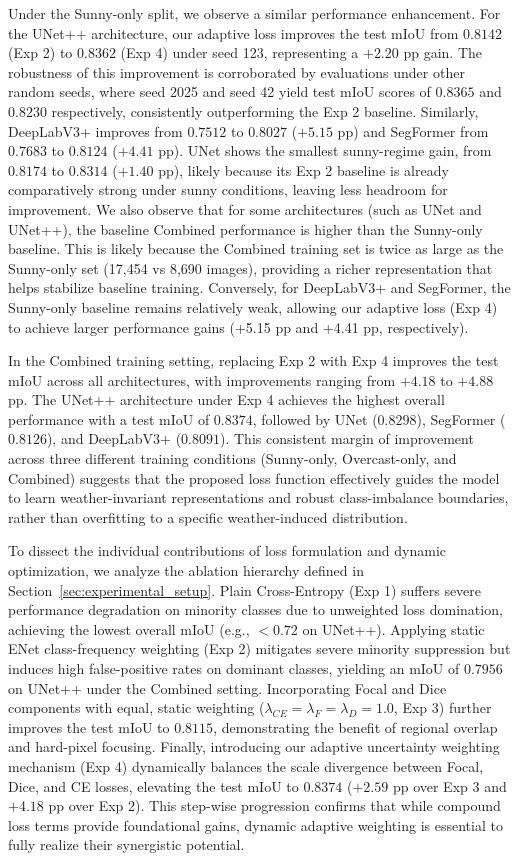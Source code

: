 \documentclass[journal,compsoc]{IEEEtran}
\begin{document}
Under the Sunny-only split, we observe a similar performance enhancement. For the UNet++ architecture, our adaptive loss improves the test mIoU from $0.8142$ (Exp 2) to $0.8362$ (Exp 4) under seed 123, representing a $+2.20$ pp gain. The robustness of this improvement is corroborated by evaluations under other random seeds, where seed 2025 and seed 42 yield test mIoU scores of $0.8365$ and $0.8230$ respectively, consistently outperforming the Exp 2 baseline. Similarly, DeepLabV3+ improves from $0.7512$ to $0.8027$ ($+5.15$ pp) and SegFormer from $0.7683$ to $0.8124$ ($+4.41$ pp). UNet shows the smallest sunny-regime gain, from $0.8174$ to $0.8314$ ($+1.40$ pp), likely because its Exp 2 baseline is already comparatively strong under sunny conditions, leaving less headroom for improvement. We also observe that for some architectures (such as UNet and UNet++), the baseline Combined performance is higher than the Sunny-only baseline. This is likely because the Combined training set is twice as large as the Sunny-only set (17,454 vs 8,690 images), providing a richer representation that helps stabilize baseline training. Conversely, for DeepLabV3+ and SegFormer, the Sunny-only baseline remains relatively weak, allowing our adaptive loss (Exp 4) to achieve larger performance gains (+5.15 pp and +4.41 pp, respectively). 

In the Combined training setting, replacing Exp 2 with Exp 4 improves the test mIoU across all architectures, with improvements ranging from $+4.18$ to $+4.88$ pp. The UNet++ architecture under Exp 4 achieves the highest overall performance with a test mIoU of $0.8374$, followed by UNet ($0.8298$), SegFormer ($0.8126$), and DeepLabV3+ ($0.8091$). This consistent margin of improvement across three different training conditions (Sunny-only, Overcast-only, and Combined) suggests that the proposed loss function effectively guides the model to learn weather-invariant representations and robust class-imbalance boundaries, rather than overfitting to a specific weather-induced distribution.

To dissect the individual contributions of loss formulation and dynamic optimization, we analyze the ablation hierarchy defined in Section~\ref{sec:experimental_setup}. Plain Cross-Entropy (Exp 1) suffers severe performance degradation on minority classes due to unweighted loss domination, achieving the lowest overall mIoU (e.g., $<0.72$ on UNet++). Applying static ENet class-frequency weighting (Exp 2) mitigates severe minority suppression but induces high false-positive rates on dominant classes, yielding an mIoU of $0.7956$ on UNet++ under the Combined setting. Incorporating Focal and Dice components with equal, static weighting ($\lambda_{CE}=\lambda_F=\lambda_D=1.0$, Exp 3) further improves the test mIoU to $0.8115$, demonstrating the benefit of regional overlap and hard-pixel focusing. Finally, introducing our adaptive uncertainty weighting mechanism (Exp 4) dynamically balances the scale divergence between Focal, Dice, and CE losses, elevating the test mIoU to $0.8374$ ($+2.59$ pp over Exp 3 and $+4.18$ pp over Exp 2). This step-wise progression confirms that while compound loss terms provide foundational gains, dynamic adaptive weighting is essential to fully realize their synergistic potential.
\end{document}

